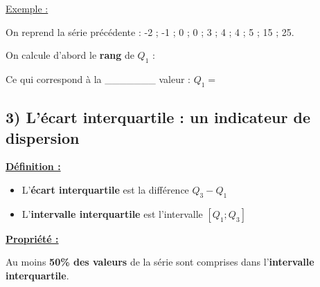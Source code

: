 \documentclass[12pt]{article}
\begin{document}
\vspace{10pt}
\underline{Exemple :}

\vspace{5pt}
On reprend la série précédente : -2 ; -1 ; 0 ; 0 ; 3 ; 4 ; 4 ; 5 ; 15 ; 25.

\vspace{20pt}
On calcule d'abord le \textbf{rang} de $Q_1$ : {\color{black!45}\dotfill}

\vspace{20pt}
Ce qui correspond à la \_\_\_\_\_\_\_ valeur : $Q_1 = $

\subsection*{\hspace{1cm} 3) L'écart interquartile : un indicateur de dispersion }
\vspace{5pt}

\begin{mdframed}[
    linewidth=1pt,
    roundcorner=5pt,
    linecolor=ForestGreen,
    innertopmargin=10pt,
    innerbottommargin=10pt
]
{\color{ForestGreen}
\textbf{\underline{Définition :}}}

\vspace{5pt}
\begin{itemize}
    \item L'\textbf{écart interquartile} est la différence $Q_3 - Q_1$
    \item L'\textbf{intervalle interquartile} est l'intervalle $\left[Q_1;Q_3\right]$
\end{itemize}

\end{mdframed}

\begin{mdframed}[
    linewidth=1pt,
    roundcorner=5pt,
    linecolor=Red,
    innertopmargin=10pt,
    innerbottommargin=10pt
]
{\color{red}
\textbf{\underline{Propriété :}}

\vspace{5pt}
Au moins \textbf{50\% des valeurs} de la série sont comprises dans l'\textbf{intervalle interquartile}.
}
\end{mdframed}
\end{document}

